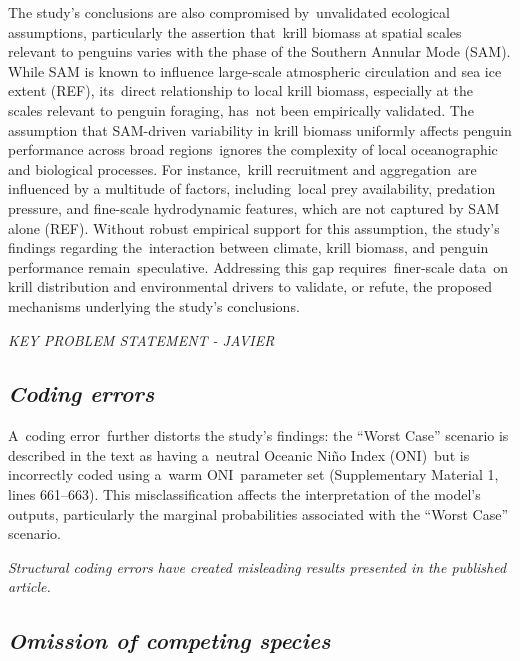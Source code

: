 \documentclass[]{elsarticle} %
\begin{document}
The study's conclusions are also compromised by~unvalidated ecological
assumptions, particularly the assertion that~krill biomass at spatial
scales relevant to penguins varies with the phase of the Southern
Annular Mode (SAM). While SAM is known to influence large-scale
atmospheric circulation and sea ice extent (REF), its~direct
relationship to local krill biomass, especially at the scales relevant
to penguin foraging, has~not been empirically validated. The assumption
that SAM-driven variability in krill biomass uniformly affects penguin
performance across broad regions~ignores the complexity of local
oceanographic and biological processes. For instance,~krill recruitment
and aggregation~are influenced by a multitude of factors,
including~local prey availability, predation pressure, and fine-scale
hydrodynamic features, which are not captured by SAM alone (REF).
Without robust empirical support for this assumption, the study's
findings regarding the~interaction between climate, krill biomass, and
penguin performance remain~speculative. Addressing this gap
requires~finer-scale data~on krill distribution and environmental
drivers to validate, or refute, the proposed mechanisms underlying the
study's conclusions.

\emph{KEY PROBLEM STATEMENT - JAVIER}

\subsection{\texorpdfstring{\emph{Coding
errors}}{Coding errors}}\label{coding-errors}

A~coding error~further distorts the study's findings: the ``Worst Case''
scenario is described in the text as having a~neutral Oceanic Niño Index
(ONI)~but is incorrectly coded using a~warm ONI~parameter set
(Supplementary Material 1, lines 661--663). This misclassification
affects the interpretation of the model's outputs, particularly the
marginal probabilities associated with the ``Worst Case'' scenario.

\emph{Structural coding errors have created misleading results presented
in the published article.}

\subsection{\texorpdfstring{\emph{Omission of competing
species}}{Omission of competing species}}\label{omission-of-competing-species}
\end{document}
